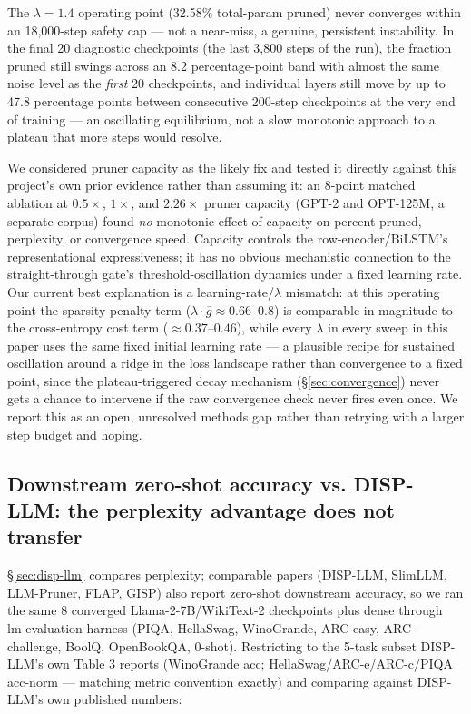 \documentclass[11pt]{article}
\begin{document}
The $\lambda=1.4$ operating point (32.58\% total-param pruned) never
converges within an 18{,}000-step safety cap --- not a near-miss, a genuine,
persistent instability. In the final 20 diagnostic checkpoints (the last
3{,}800 steps of the run), the fraction pruned still swings across an 8.2
percentage-point band with almost the same noise level as the \emph{first} 20
checkpoints, and individual layers still move by up to 47.8 percentage
points between consecutive 200-step checkpoints at the very end of training
--- an oscillating equilibrium, not a slow monotonic approach to a plateau
that more steps would resolve.

We considered pruner capacity as the likely fix and tested it directly
against this project's own prior evidence rather than assuming it: an
8-point matched ablation at $0.5\times$, $1\times$, and $2.26\times$ pruner
capacity (GPT-2 and OPT-125M, a separate corpus) found \emph{no} monotonic effect
of capacity on percent pruned, perplexity, or convergence speed. Capacity
controls the row-encoder/BiLSTM's representational expressiveness; it has no
obvious mechanistic connection to the straight-through gate's
threshold-oscillation dynamics under a fixed learning rate. Our current best
explanation is a learning-rate/$\lambda$ mismatch: at this operating point
the sparsity penalty term ($\lambda \cdot \overline{g} \approx 0.66$--$0.8$)
is comparable in magnitude to the cross-entropy cost term ($\approx
0.37$--$0.46$), while every $\lambda$ in every sweep in this paper uses the
same fixed initial learning rate --- a plausible recipe for sustained
oscillation around a ridge in the loss landscape rather than convergence to
a fixed point, since the plateau-triggered decay mechanism (\S\ref{sec:convergence}) never gets
a chance to intervene if the raw convergence check never fires even once. We
report this as an open, unresolved methods gap rather than retrying with a
larger step budget and hoping.

\subsection{Downstream zero-shot accuracy vs. DISP-LLM: the perplexity advantage does not transfer}
\label{sec:downstream}

\S\ref{sec:disp-llm} compares perplexity; comparable papers (DISP-LLM, SlimLLM, LLM-Pruner,
FLAP, GISP) also report zero-shot downstream accuracy, so we ran the same 8
converged Llama-2-7B/WikiText-2 checkpoints plus dense through
lm-evaluation-harness (PIQA, HellaSwag, WinoGrande, ARC-easy, ARC-challenge,
BoolQ, OpenBookQA, 0-shot). Restricting to the 5-task subset DISP-LLM's own
Table 3 reports (WinoGrande acc; HellaSwag/ARC-e/ARC-c/PIQA acc-norm ---
matching metric convention exactly) and comparing against DISP-LLM's own
published numbers:
\end{document}

